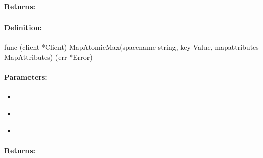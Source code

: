 \paragraph{Returns:}


\pagebreak
\subsubsection{}
\label{api:Go:MapAtomicMax}


\paragraph{Definition:}
\begin{gocode}
func (client *Client) MapAtomicMax(spacename string, key Value, mapattributes MapAttributes) (err *Error)
\end{gocode}

\paragraph{Parameters:}
\begin{itemize}[noitemsep]
\item {}\\

\item {}\\

\item {}\\

\end{itemize}

\paragraph{Returns:}


\pagebreak
\subsubsection{}
\label{api:Go:CondMapAtomicMax}


